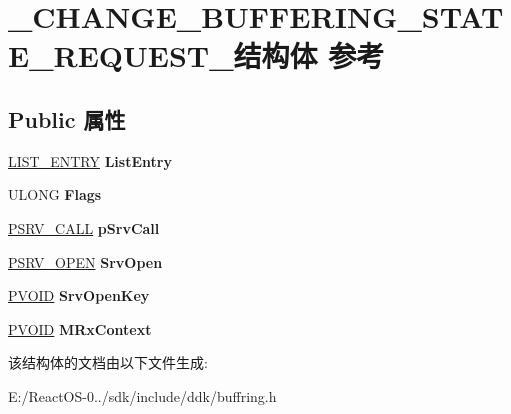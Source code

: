 \hypertarget{struct___c_h_a_n_g_e___b_u_f_f_e_r_i_n_g___s_t_a_t_e___r_e_q_u_e_s_t__}{}\section{\+\_\+\+C\+H\+A\+N\+G\+E\+\_\+\+B\+U\+F\+F\+E\+R\+I\+N\+G\+\_\+\+S\+T\+A\+T\+E\+\_\+\+R\+E\+Q\+U\+E\+S\+T\+\_\+结构体 参考}
\label{struct___c_h_a_n_g_e___b_u_f_f_e_r_i_n_g___s_t_a_t_e___r_e_q_u_e_s_t__}
\subsection*{Public 属性}
\begin{DoxyCompactItemize}
\item 
\mbox{\label{struct___c_h_a_n_g_e___b_u_f_f_e_r_i_n_g___s_t_a_t_e___r_e_q_u_e_s_t___abc4a54ac4e6b955c27156386658bc180}} 
\hyperlink{struct___l_i_s_t___e_n_t_r_y}{L\+I\+S\+T\+\_\+\+E\+N\+T\+RY} {\bfseries List\+Entry}
\item 
\mbox{\label{struct___c_h_a_n_g_e___b_u_f_f_e_r_i_n_g___s_t_a_t_e___r_e_q_u_e_s_t___adc57b781343b1bf6f2cb3254cc14de42}} 
U\+L\+O\+NG {\bfseries Flags}
\item 
\mbox{\label{struct___c_h_a_n_g_e___b_u_f_f_e_r_i_n_g___s_t_a_t_e___r_e_q_u_e_s_t___a9f357d4ae4cbd1a61c9c7b141a507f06}} 
\hyperlink{struct___s_r_v___c_a_l_l}{P\+S\+R\+V\+\_\+\+C\+A\+LL} {\bfseries p\+Srv\+Call}
\item 
\mbox{\label{struct___c_h_a_n_g_e___b_u_f_f_e_r_i_n_g___s_t_a_t_e___r_e_q_u_e_s_t___a49a611ba2c42e9fc9cd66492834144ec}} 
\hyperlink{struct___s_r_v___o_p_e_n}{P\+S\+R\+V\+\_\+\+O\+P\+EN} {\bfseries Srv\+Open}
\item 
\mbox{\label{struct___c_h_a_n_g_e___b_u_f_f_e_r_i_n_g___s_t_a_t_e___r_e_q_u_e_s_t___a2340af6486d05eb17be2004dfbe6ad4d}} 
\hyperlink{interfacevoid}{P\+V\+O\+ID} {\bfseries Srv\+Open\+Key}
\item 
\mbox{\label{struct___c_h_a_n_g_e___b_u_f_f_e_r_i_n_g___s_t_a_t_e___r_e_q_u_e_s_t___a0d04c1f298ad80ce6f6cab11995e96a4}} 
\hyperlink{interfacevoid}{P\+V\+O\+ID} {\bfseries M\+Rx\+Context}
\end{DoxyCompactItemize}


该结构体的文档由以下文件生成\+:\begin{DoxyCompactItemize}
\item 
E\+:/\+React\+O\+S-\/0../sdk/include/ddk/buffring.\+h\end{DoxyCompactItemize}
